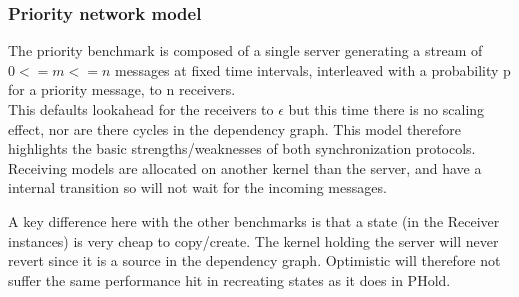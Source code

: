 \subsubsection{Priority network model}
The priority benchmark is composed of a single server generating a stream of $0<=m<=n$ messages at fixed time intervals, interleaved with a probability p for a priority message, to n receivers. \\ This defaults lookahead for the receivers to $\epsilon$ but this time there is no scaling effect, nor are there cycles in the dependency graph. This model therefore highlights the basic strengths/weaknesses of both synchronization protocols. Receiving models are allocated on another kernel than the server, and have a internal transition so will not wait for the incoming messages. 

A key difference here with the other benchmarks is that a state (in the Receiver instances) is very cheap to copy/create. The kernel holding the server will never revert since it is a source in the dependency graph. Optimistic will therefore not suffer the same performance hit in recreating states as it does in PHold. 

